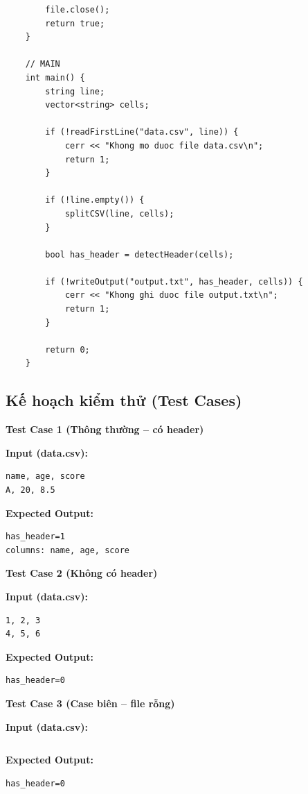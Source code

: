 \begin{lstlisting}
        file.close();
        return true;
    }

    // MAIN
    int main() {
        string line;
        vector<string> cells;

        if (!readFirstLine("data.csv", line)) {
            cerr << "Khong mo duoc file data.csv\n";
            return 1;
        }

        if (!line.empty()) {
            splitCSV(line, cells);
        }

        bool has_header = detectHeader(cells);

        if (!writeOutput("output.txt", has_header, cells)) {
            cerr << "Khong ghi duoc file output.txt\n";
            return 1;
        }

        return 0;
    }
\end{lstlisting}

\subsection{Kế hoạch kiểm thử (Test Cases)}

\textbf{Test Case 1 (Thông thường -- có header)}

\textbf{Input (data.csv):}
\begin{lstlisting}
name, age, score
A, 20, 8.5
\end{lstlisting}

\textbf{Expected Output:}
\begin{lstlisting}
has_header=1
columns: name, age, score
\end{lstlisting}

\vspace{0.5cm}

\textbf{Test Case 2 (Không có header)}

\textbf{Input (data.csv):}
\begin{lstlisting}
1, 2, 3
4, 5, 6
\end{lstlisting}

\textbf{Expected Output:}
\begin{lstlisting}
has_header=0
\end{lstlisting}

\vspace{0.5cm}

\textbf{Test Case 3 (Case biên -- file rỗng)}

\textbf{Input (data.csv):}
\begin{lstlisting}
\end{lstlisting}

\textbf{Expected Output:}
\begin{lstlisting}
has_header=0
\end{lstlisting}